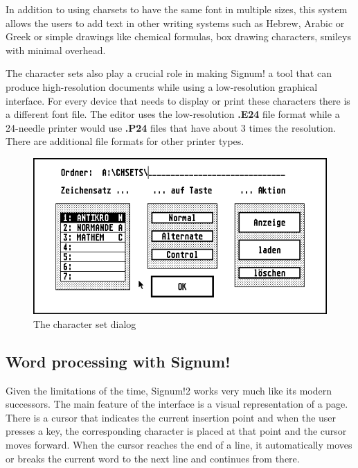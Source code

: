 In addition to using \glspl{charset} to have the same font in multiple sizes, this system allows the users to add text in other writing systems such as Hebrew, Arabic or Greek or simple drawings like chemical formulas, box drawing characters, smileys with minimal overhead.

The character sets also play a crucial role in making Signum! a tool that can produce high-resolution documents while using a low-resolution graphical interface. For every device that needs to display or print these characters there is a different font file. The editor uses the low-resolution \textbf{.E24} file format while a 24-needle printer would use \textbf{.P24} files that have about 3 times the resolution. There are additional file formats for other printer types.

\begin{figure}[h]
    \centering
    \includegraphics[width=\columnwidth]{img/cset-dialog.png}
    \caption{The character set dialog \label{fig:cset-dialog}}
\end{figure}

\subsection{Word processing with Signum!}

Given the limitations of the time, \gls{Signum!2} works very much like its modern successors. The main feature of the interface is a visual representation of a page. There is a cursor that indicates the current insertion point and when the user presses a key, the corresponding character is placed at that point and the cursor moves forward. When the cursor reaches the end of a line, it automatically moves or breaks the current word to the next line and continues from there.

